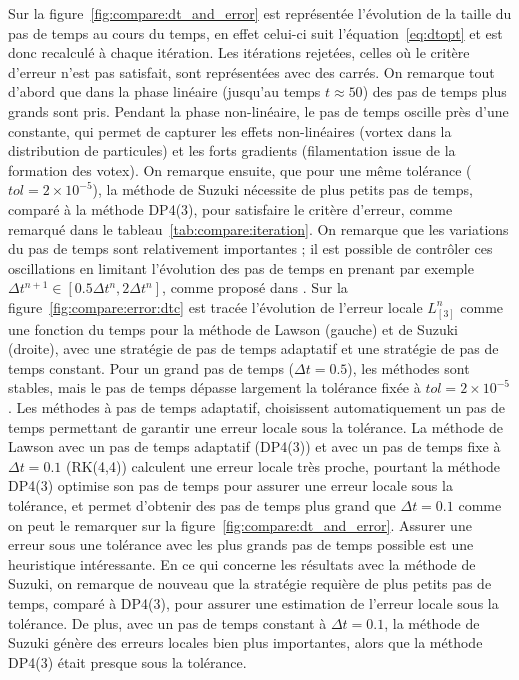 Sur la figure~\ref{fig:compare:dt_and_error} est représentée l'évolution de la taille du pas de temps au cours du temps, en effet celui-ci suit l'équation~\eqref{eq:dtopt} et est donc recalculé à chaque itération. Les itérations rejetées, celles où le critère d'erreur n'est pas satisfait, sont représentées avec des carrés. On remarque tout d'abord que dans la phase linéaire (jusqu'au temps $t\approx 50$) des pas de temps plus grands sont pris. Pendant la phase non-linéaire, le pas de temps oscille près d'une constante, qui permet de capturer les effets non-linéaires (vortex dans la distribution de particules) et les forts gradients (filamentation issue de la formation des votex). On remarque ensuite, que pour une même tolérance ($tol=2\times10^{-5}$), la méthode de Suzuki nécessite de plus petits pas de temps, comparé à la méthode DP4(3), pour satisfaire le critère d'erreur, comme remarqué dans le tableau~\ref{tab:compare:iteration}. On remarque que les variations du pas de temps sont relativement importantes ; il est possible de contrôler ces oscillations en limitant l'évolution des pas de temps en prenant par exemple $\Delta t^{n+1}\in[0.5\Delta t^n,2\Delta t^n]$, comme proposé dans \cite{Balac:2014}. Sur la figure~\ref{fig:compare:error:dtc} est tracée l'évolution de l'erreur locale $L_{[3]}^n$ comme une fonction du temps pour la méthode de Lawson (gauche) et de Suzuki (droite), avec une stratégie de pas de temps adaptatif et une stratégie de pas de temps constant. Pour un grand pas de temps ($\Delta t = 0.5$), les méthodes sont stables, mais le pas de temps dépasse largement la tolérance fixée à $tol=2\times10^{-5}$. Les méthodes à pas de temps adaptatif, choisissent automatiquement un pas de temps permettant de garantir une erreur locale sous la tolérance. La méthode de Lawson avec un pas de temps adaptatif (DP4(3)) et avec un pas de temps fixe à $\Delta t = 0.1$ (RK(4,4)) calculent une erreur locale très proche, pourtant la méthode DP4(3) optimise son pas de temps pour assurer une erreur locale sous la tolérance, et permet d'obtenir des pas de temps plus grand que $\Delta t =0.1$ comme on peut le remarquer sur la figure~\ref{fig:compare:dt_and_error}. Assurer une erreur sous une tolérance avec les plus grands pas de temps possible est une heuristique intéressante. En ce qui concerne les résultats avec la méthode de Suzuki, on remarque de nouveau que la stratégie requière de plus petits pas de temps, comparé à DP4(3), pour assurer une estimation de l'erreur locale sous la tolérance. De plus, avec un pas de temps constant à $\Delta t = 0.1$, la méthode de Suzuki génère des erreurs locales bien plus importantes, alors que la méthode DP4(3) était presque sous la tolérance.

